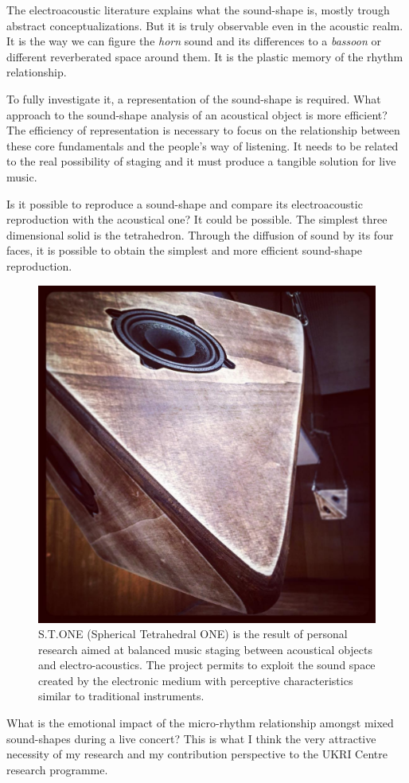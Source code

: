 \documentclass[
	a4paper,
	twocolumn
	]{article}
\begin{document}
The electroacoustic literature explains what the sound-shape is, mostly trough abstract conceptualizations. But it is truly observable even in the acoustic realm. It is the way we can figure the \emph{horn} sound and its differences to a \emph{bassoon} or different reverberated space around them. It is the plastic memory of the rhythm relationship.

To fully investigate it, a representation of the sound-shape is required. What approach to the sound-shape analysis of an acoustical object is more efficient? The efficiency of representation is necessary to focus on the relationship between these core fundamentals and the people's way of listening. It needs to be related to the real possibility of staging and it must produce a tangible solution for live music.

Is it possible to reproduce a sound-shape and compare its electroacoustic reproduction with the acoustical one? It could be possible. The simplest three dimensional solid is the tetrahedron. Through the diffusion of sound by its four faces, it is possible to obtain the simplest and more efficient sound-shape reproduction.

\begin{figure}[htbp]
\begin{center}
\includegraphics[width=.47\textwidth]{img/13556748_1807931906092757_1243460980_n.jpg}
\caption{S.T.ONE (Spherical Tetrahedral ONE) is the result of personal research aimed at balanced music staging between acoustical objects and electro-acoustics. The project permits to exploit the sound space created by the electronic medium with perceptive characteristics similar to traditional instruments. %
}
\label{stone2}
\end{center}
\end{figure}

What is the emotional impact of the micro-rhythm relationship amongst mixed sound-shapes during a live concert? This is what I think the very attractive necessity of my research and my contribution perspective to the UKRI Centre research programme. %
\end{document}
